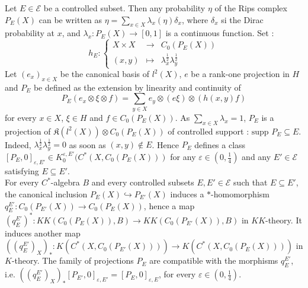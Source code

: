 Let $E\in\mathcal E$ be a controlled subset. Then any probability $\eta$ of the Rips complex $P_E(X)$ can be written as $\eta = \sum_{x\in X} \lambda_x(\eta) \delta_x$, where $\delta_x$ si the Dirac probability at $x$, and $\lambda_x : P_E(X)\rightarrow [0,1]$ is a continuous function. Set :
\[ h_E : \left\{\begin{array}{rcl} X \times X & \rightarrow & C_0(P_E(X))\\  (x,y) & \mapsto & \lambda_x^{\frac{1}{2}}\lambda_y^{\frac{1}{2}}\end{array}\right. \]  
Let $(e_x)_{x\in X}$ be the canonical basis of $l^2(X)$, $e$ be a rank-one projection in $H$ and $P_E$ be defined as the extension by linearity and continuity of
\[P_E(e_x\otimes\xi\otimes f)= \sum_{y\in X} e_y\otimes (e\xi)\otimes (h(x,y)f)\] 
for every $x\in X$, $\xi\in H$ and $f\in C_0(P_E(X))$. As $\sum_{x\in X} \lambda_x =1$, $P_E$ is a projection of $\mathfrak K(l^2(X)) \otimes C_0(P_E(X))$ of controlled support : $\text{supp }P_E\subseteq E$. Indeed, $\lambda_x^{\frac{1}{2}}\lambda_y^{\frac{1}{2}} =0$ as soon as $(x,y)\notin E$. Hence $P_E$ defines a class $[P_E,0]_{\varepsilon, E'}\in K_0^{\varepsilon, E'} (C^*(X,C_0(P_E(X)))$ for any $\varepsilon\in (0,\frac{1}{4})$ and any $E'\in\mathcal E$ satisfying $E\subseteq E'$.\\

For every $C^*$-algebra $B$ and every controlled subsets $E,E'\in\mathcal E$ such that $E\subseteq E'$, the canonical inclusion $P_E(X)\hookrightarrow P_{E'}(X)$ induces a $*$-homomorphism $q_E^{E'} : C_0(P_{E'}(X))\rightarrow C_0(P_{E}(X))$, hence a map $(q_E^{E'})^* : KK(C_0(P_E(X)),B)\rightarrow KK(C_0(P_{E'}(X)),B)$ in $KK$-theory. It induces another map $((q_E^{E'})_X)_* : K(C^*(X,C_0(P_{E'}(X))))\rightarrow K(C^*(X,C_0(P_{E}(X))))$ in $K$-theory. The family of projections $P_E$ are compatible with the morphisms $q_E^{E'}$, i.e. $((q_E^{E'})_X)_*[P_{E'},0]_{\varepsilon,E'} = [P_{E},0]_{\varepsilon,E}$, for every $\varepsilon\in (0,\frac{1}{4})$.

